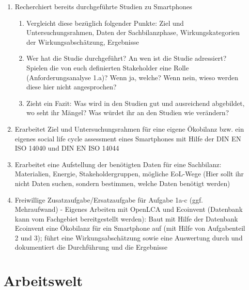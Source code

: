 \documentclass[DIV=15,headinclude=true]{scrartcl}
\begin{document}
\begin{enumerate}
	\item
	      Recherchiert bereits durchgeführte Studien zu Smartphones

	      \begin{enumerate}
		      \item
		            Vergleicht diese bezüglich folgender Punkte: Ziel und
		            Untersuchungsrahmen, Daten der Sachbilanzphase, Wirkungskategorien
		            der Wirkungsabschätzung, Ergebnisse
		      \item
		            Wer hat die Studie durchgeführt? An wen ist die Studie adressiert?
		            Spielen die von euch definierten Stakeholder eine Rolle
		            (Anforderungsanalyse 1.a)? Wenn ja, welche? Wenn nein, wieso werden
		            diese hier nicht angesprochen?
		      \item
		            Zieht ein Fazit: Was wird in den Studien gut und ausreichend
		            abgebildet, wo seht ihr Mängel? Was würdet ihr an den Studien wie
		            verändern?
	      \end{enumerate}
	\item
	      Erarbeitet Ziel und Untersuchungsrahmen für eine eigene Ökobilanz bzw.
	      ein eigenes social life cycle assessment eines Smartphones mit Hilfe
	      der DIN EN ISO 14040 und DIN EN ISO 14044
	\item
	      Erarbeitet eine Aufstellung der benötigten Daten für eine Sachbilanz:
	      Materialien, Energie, Stakeholdergruppen, mögliche EoL-Wege (Hier
	      sollt ihr nicht Daten suchen, sondern bestimmen, welche Daten benötigt
	      werden)
	\item
	      Freiwillige Zusatzaufgabe/Ersatzaufgabe für Aufgabe 1a-c (ggf.
	      Mehraufwand) - Eigenes Arbeiten mit OpenLCA und Ecoinvent (Datenbank
	      kann vom Fachgebiet bereitgestellt werden): Baut mit Hilfe der
	      Datenbank Ecoinvent eine Ökobilanz für ein Smartphone auf (mit Hilfe
	      von Aufgabenteil 2 und 3); führt eine Wirkungsabschätzung sowie eine
	      Auswertung durch und dokumentiert die Durchführung und die Ergebnisse
\end{enumerate}

\section{Arbeitswelt}
\end{document}
